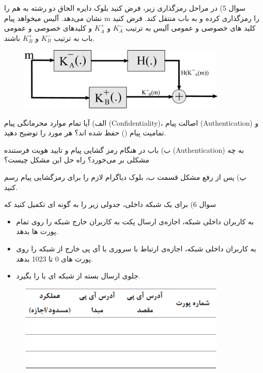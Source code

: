 \documentclass{article}
\begin{document}
\newpage
سوال 5) در مراحل رمزگذاری زیر، فرض کنید بلوک دایره الحاق دو رشته به هم را نشان می‌دهد. آلیس میخواهد پیام m را رمزگذاری کرده و به باب منتقل کند. فرض کنید کلید های خصوصی و عمومی آلیس به ترتیب
$
K_A^-
$
و
$
K_A^+
$
و کلیدهای خصوصی و عمومی باب به ترتیب
$
K_B^-
$
و
$
K_B^+
$
باشند.
\begin{figure}[htbp]
\centering
\includegraphics[width=100mm]{crypto.eps}
\end{figure}

الف) آیا تمام موارد محرمانگی پیام (Confidentiality)، اصالت پیام (Authentication) و تمامیت پیام () حفظ شده اند؟ هر مورد را توضیح دهید.

ب) باب در هنگام رمز گشایی پیام و تایید هویت فرستنده (Authentication) به چه مشکلی بر می‌خورد؟ راه حل این مشکل چیست؟

پ) پس از رفع مشکل قسمت ب، بلوک دیاگرام لازم را برای رمزگشایی پیام رسم کنید.

\newpage
سوال 6) برای  یک شبکه داخلی، جدولی زیر را به گونه ای تکمیل کنید که
\begin{itemize}
\item
به کاربران داخلی شبکه، اجازه‌ی ارسال پکت به کاربران خارج شبکه را روی تمام پورت ها بدهد.
\item
به کاربران داخلی شبکه، اجازه‌ی ارتباط با سروری با آی پی  خارج از شبکه را روی پورت های 0 تا 1023 بدهد.
\item
جلوی ارسال بسته از شبکه ای با 
را بگیرد.
\end{itemize}
\begin{figure}[htbp]
\centering
\includegraphics[width=100mm]{firewall.png}
\end{figure}
\end{document}
